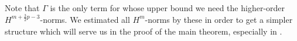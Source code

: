 Note that $\Gamma$ is the only term for whose upper bound we need the higher-order $H^{m+\frac 3 2 p -3}$-norms.
We estimated all $H^m$-norms by these in order to get a simpler structure which will serve us in the proof of the main theorem, especially in .



